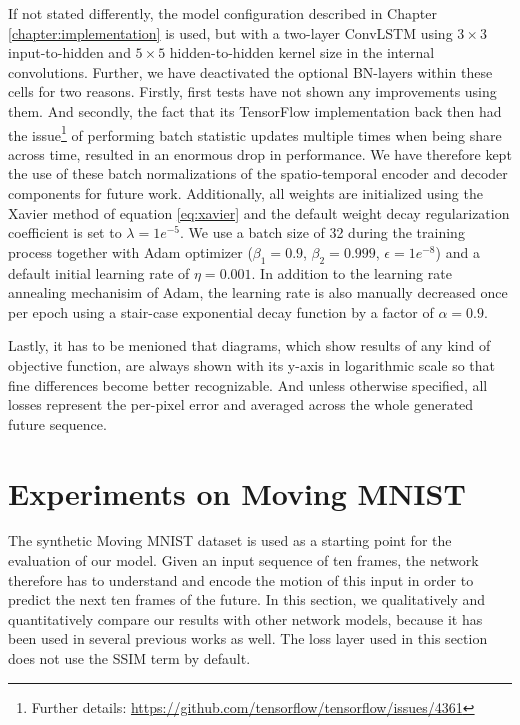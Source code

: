If not stated differently, the model configuration described in Chapter \ref{chapter:implementation} is used, but with a two-layer ConvLSTM using $3\times3$ input-to-hidden and $5\times5$ hidden-to-hidden kernel size in the internal convolutions. Further, we have deactivated the optional BN-layers within these cells for two reasons. Firstly, first tests have not shown any improvements using them. And secondly, the fact that its TensorFlow implementation back then had the issue\footnote{Further details: \url{https://github.com/tensorflow/tensorflow/issues/4361}} of performing batch statistic updates multiple times when being share across time, resulted in an enormous drop in performance. We have therefore kept the use of these batch normalizations of the spatio-temporal encoder and decoder components for future work. Additionally, all weights are initialized using the Xavier method of equation \ref{eq:xavier} and the default weight decay regularization coefficient is set to $\lambda=1e^{-5}$. We use a batch size of 32 during the training process together with Adam optimizer ($\beta_1 = 0.9$, $\beta_2 = 0.999$, $\epsilon =1e^{-8}$) and a default initial learning rate of $\eta = 0.001$. In addition to the learning rate annealing mechanisim of Adam, the learning rate is also manually decreased once per epoch using a stair-case exponential decay function by a factor of $\alpha=0.9$.

Lastly, it has to be menioned that diagrams, which show results of any kind of objective function, are always shown with its y-axis in logarithmic scale so that fine differences become better recognizable. And unless otherwise specified, all losses represent the per-pixel error and averaged across the whole generated future sequence.

\section{Experiments on Moving MNIST} \label{sec:exp-mm}

The synthetic Moving MNIST dataset is used as a starting point for the evaluation of our model. Given an input sequence of ten frames, the network therefore has to understand and encode the motion of this input in order to predict the next ten frames of the future. In this section, we qualitatively and quantitatively compare our results with other network models, because it has been used in several previous works as well. The loss layer used in this section does not use the SSIM term by default.

